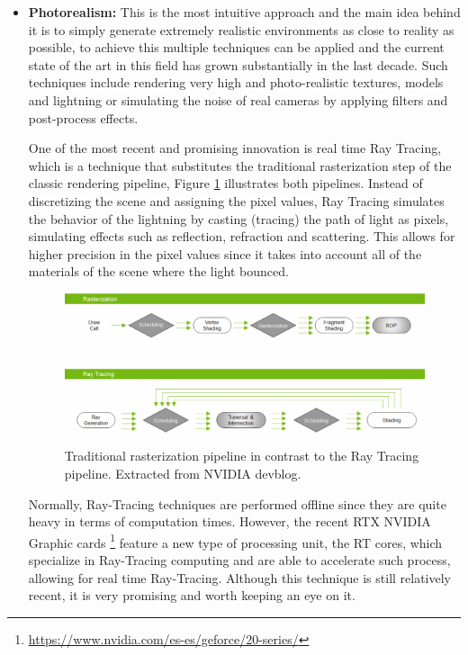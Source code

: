 \begin{itemize}
	\item \textbf{Photorealism:} This is the most intuitive approach and the main idea behind it is to simply generate extremely realistic environments as close to reality as possible, to achieve this multiple techniques can be applied and the current state of the art in this field has grown substantially in the last decade. Such techniques include rendering very high and photo-realistic textures, models and lightning or simulating the noise of real cameras by applying filters and post-process effects. 
	
	One of the most recent and promising innovation is real time Ray Tracing, which is a technique that substitutes the traditional rasterization step of the classic rendering pipeline, Figure \ref{fig:pipeline} illustrates both pipelines. Instead of discretizing the scene and assigning the pixel values, Ray Tracing simulates the behavior of the lightning by casting (tracing) the path of light as pixels, simulating effects such as reflection, refraction and scattering. This allows for higher precision in the pixel values since it takes into account all of the materials of the scene where the light bounced.
	
	\begin{figure}
		\centering
		\includegraphics[width=\linewidth]{archivos/pipeline}
		\caption[Traditional rasterization pipeline in contrast to the Ray Tracing pipeline.]{Traditional rasterization pipeline in contrast to the Ray Tracing pipeline. Extracted from NVIDIA devblog\footnotemark.}
		\label{fig:pipeline}
	\end{figure}
	
	Normally, Ray-Tracing techniques are performed offline since they are quite heavy in terms of computation times. However, the recent RTX NVIDIA Graphic cards \footnote{\url{https://www.nvidia.com/es-es/geforce/20-series/}} feature a new type of processing unit, the RT cores, which specialize in Ray-Tracing computing and are able to accelerate such process, allowing for real time Ray-Tracing. Although this technique is still relatively recent, it is very promising and worth keeping an eye on it.


\end{itemize}
